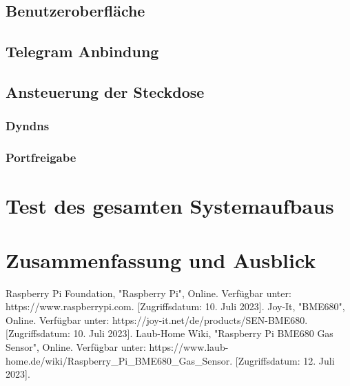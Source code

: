 \documentclass[conference]{IEEEtran}
\begin{document}
\subsection{Benutzeroberfläche}
\subsection{Telegram Anbindung}
\subsection{Ansteuerung der Steckdose}
\subsubsection{Dyndns}
\subsubsection{Portfreigabe}


\section{Test des gesamten Systemaufbaus}

\section{Zusammenfassung und Ausblick}

\begin{thebibliography}{00}
Raspberry Pi Foundation, "Raspberry Pi", Online. Verfügbar unter: https://www.raspberrypi.com. [Zugriffsdatum: 10. Juli 2023].
Joy-It, "BME680", Online. Verfügbar unter: https://joy-it.net/de/products/SEN-BME680. [Zugriffsdatum: 10. Juli 2023].
Laub-Home Wiki, "Raspberry Pi BME680 Gas Sensor", Online. Verfügbar unter: https://www.laub-home.de/wiki/Raspberry\_Pi\_BME680\_Gas\_Sensor. [Zugriffsdatum: 12. Juli 2023].
\end{thebibliography}
\end{document}

